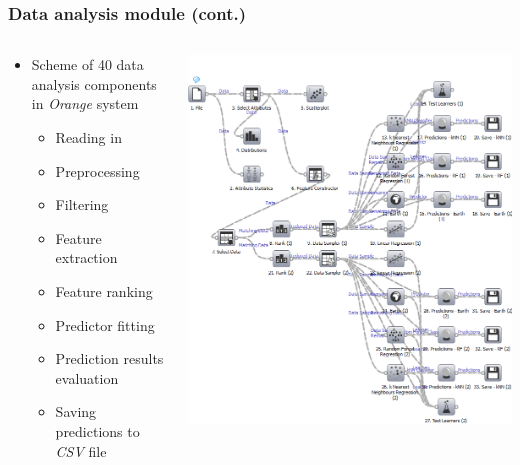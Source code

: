 \documentclass{beamer}
\begin{document}
\begin{frame}
\frametitle{Data analysis module (cont.)}
	\begin{columns}[T]
	\begin{column}{0.5\textwidth}
		\begin{itemize}
			\item Scheme of 40 data analysis components in \textit{Orange} system
			\begin{itemize}
				\item Reading in
				\item Preprocessing
				\item Filtering
				\item Feature extraction
				\item Feature ranking
				\item Predictor fitting
				\item Prediction results evaluation
				\item Saving predictions to \textit{CSV} file
			\end{itemize}
		\end{itemize}
	\end{column}
	\begin{column}{0.5\textwidth}
		\includegraphics[width=\textwidth]{series30}
	\end{column}
	\end{columns}

\end{frame}
\end{document}
